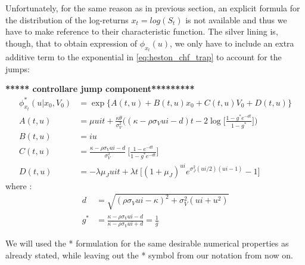 Unfortunately, for the same reason as in previous section, an explicit formula for the distribution of the log-returns $x_t = log(S_t)$ is not available and thus we have to make reference to their characteristic function.
The silver lining is, though, that to obtain expression of   $\phi_{x_t}(u)$, we only have to include an extra additive term to the exponential in \eqref{eq:heston_chf_trap} to account for the jumps:

\textbf{***** controllare jump component*********}
\begin{equation}
\begin{split}
\label{eq:heston_chf_trap}
\phi_{x_t}^*(u| x_0, V_0) &= \exp\{A(t,u) + B(t,u) x_0 + C(t,u) V_0 + D(t,u)\}\\
A(t,u) &= \mu u i t +  \frac{\kappa\theta}{\sigma_V^2} \bigg( (\kappa - \rho\sigma_V u i - d)t - 2 \log\Big[  \frac{1-g^*e^{-dt}}{1-g^*} \Big] \bigg)\\
B(t,u) &= i u \\
C(t,u)&= \frac{\kappa - \rho\sigma_V u i - d}{\sigma_V^2} \:\Big[\frac{1-e^{-dt}}{1-g^*e^{-dt}}\Big]\\
D(t,u) &= -\lambda \mu_J u i t + \lambda t  \:\Big[ (1+\mu_J)^{ui} e^{\sigma_J^2(ui/2)(ui-1)}-1 \Big]
\end{split}
\end{equation} 
where :
\begin{equation*}
\begin{split}
d&=\sqrt{(\rho \sigma_V u i - \kappa)^2 + \sigma_V^2(u i + u^2)}\\
g^*&= \frac{\kappa - \rho\sigma_V u i - d}{\kappa - \rho\sigma_V u i + d} = \frac{1}{g}
\end{split}
\end{equation*} 

We will used the  *  formulation for the same desirable numerical properties as already stated, while leaving out the * symbol from our notation from now on.
